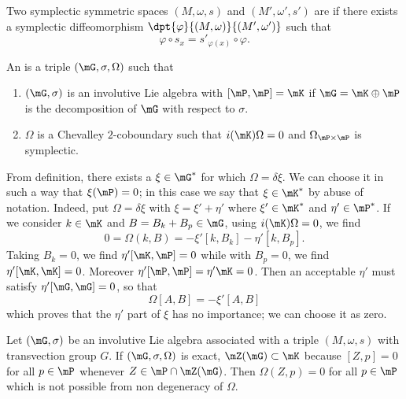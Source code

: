\begin{definition}
	Two symplectic symmetric spaces $(M,\omega,s)$ and $(M',\omega',s')$  are  if there exists a symplectic diffeomorphism $\dpt{\varphi}{(M,\omega)}{(M',\omega')}$ such that
	\begin{equation}
		\varphi\circ s_x=s'_{\varphi(x)}\circ\varphi.
	\end{equation}

\end{definition}


\begin{definition}
	An  is a triple $(\mG,\sigma,\Omega)$ such that

	\begin{enumerate}
		\item $(\mG,\sigma)$ is an involutive Lie algebra with $[\mP,\mP]=\mK$ if $\mG=\mK\oplus\mP$ is the decomposition of $\mG$ with respect to $\sigma$.

		\item $\Omega$ is a Chevalley $2$-coboundary such that $i(\mK)\Omega=0$ and $\Omega_{\mP\times\mP}$ is symplectic.

	\end{enumerate}

\end{definition}

From definition, there exists a $\xi\in\mG^*$ for which $\Omega=\delta\xi$. We can choose it in such a way that $\xi(\mP)=0$; in this case we say that $\xi\in\mK^*$ by abuse of notation. Indeed, put $\Omega=\delta\xi$ with $\xi=\xi'+\eta'$ where $\xi'\in\mK^*$ and $\eta'\in\mP^*$. If we consider $k\in\mK$ and $B=B_k+B_p\in\mG$, using $i(\mK)\Omega=0$, we find
\[
	0=\Omega(k,B)=-\xi'[k,B_k]-\eta'[k,B_p].
\]
Taking $B_k=0$, we find $\eta'[\mK,\mP]=0$ while with $B_p=0$, we find $\eta'[\mK,\mK]=0$. Moreover $\eta'[\mP,\mP]=\eta'\mK=0$. Then an acceptable $\eta'$ must satisfy $\eta'[\mG,\mG]=0$, so that
\[
	\Omega[A,B]=-\xi'[A,B]
\]
which proves that the $\eta'$ part of $\xi$ has no importance; we can choose it as zero.


Let $(\mG,\sigma)$ be an involutive Lie algebra associated with a triple $(M,\omega,s)$ with transvection group $G$. If $(\mG,\sigma,\Omega)$ is exact, $\mZ(\mG)\subset \mK$ because $[Z,p]=0$ for all $p\in\mP$ whenever $Z\in\mP\cap\mZ(\mG)$. Then $\Omega(Z,p)=0$ for all $p\in \mP$ which is not possible from non degeneracy of $\Omega$.

